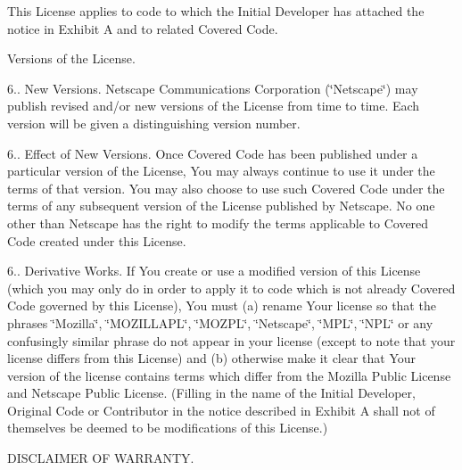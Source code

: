 \begin{DoxyEnumerate}
This License applies to code to which the Initial Developer has attached the notice in Exhibit A and to related Covered Code.
\item Versions of the License.

6.. New Versions. Netscape Communications Corporation (\char`\"{}\-Netscape\char`\"{}) may publish revised and/or new versions of the License from time to time. Each version will be given a distinguishing version number.

6.. Effect of New Versions. Once Covered Code has been published under a particular version of the License, You may always continue to use it under the terms of that version. You may also choose to use such Covered Code under the terms of any subsequent version of the License published by Netscape. No one other than Netscape has the right to modify the terms applicable to Covered Code created under this License.

6.. Derivative Works. If You create or use a modified version of this License (which you may only do in order to apply it to code which is not already Covered Code governed by this License), You must (a) rename Your license so that the phrases \char`\"{}\-Mozilla\char`\"{}, \char`\"{}\-M\-O\-Z\-I\-L\-L\-A\-P\-L\char`\"{}, \char`\"{}\-M\-O\-Z\-P\-L\char`\"{}, \char`\"{}\-Netscape\char`\"{}, \char`\"{}\-M\-P\-L\char`\"{}, \char`\"{}\-N\-P\-L\char`\"{} or any confusingly similar phrase do not appear in your license (except to note that your license differs from this License) and (b) otherwise make it clear that Your version of the license contains terms which differ from the Mozilla Public License and Netscape Public License. (Filling in the name of the Initial Developer, Original Code or Contributor in the notice described in Exhibit A shall not of themselves be deemed to be modifications of this License.)
\item D\-I\-S\-C\-L\-A\-I\-M\-E\-R O\-F W\-A\-R\-R\-A\-N\-T\-Y.


\end{DoxyEnumerate}
